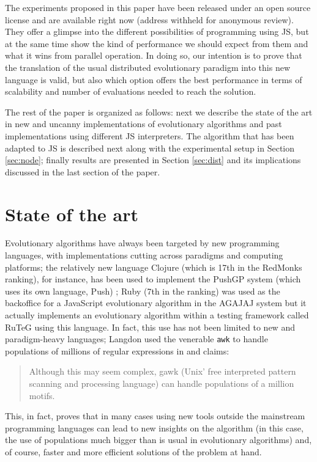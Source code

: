 \documentclass{sig-alternate}
\begin{document}
The experiments proposed in this paper have been released under an
open source license and are available right now (address withheld for
anonymous review). They offer a glimpse into the different
possibilities of programming using JS, but at the same time
show the kind of performance we should expect from them and what it
wins from parallel operation. In doing so, our intention is to prove
that the translation of the usual distributed evolutionary paradigm
into this new language is valid, but also which option offers the best
performance in terms of scalability and number of evaluations needed
to reach the solution.

The rest of the paper is organized as follows: next we describe the
state of the art in new and uncanny implementations of evolutionary algorithms and
past implementations using different JS interpreters. The
algorithm that has been adapted to JS is described next along with the
experimental setup in Section \ref{sec:node}; finally results are
presented in Section \ref{sec:dist} and its implications
discussed in the last section of the paper. 

\section{State of the art}
\label{sec:soa}

Evolutionary algorithms have always been targeted by new programming
languages, with implementations cutting across paradigms and computing
platforms; the relatively new language Clojure (which is 17th in the
RedMonks ranking), for instance, has been used to implement the PushGP
system (which uses its own language, Push) \cite{helmuth2013evolving};
Ruby (7th in the ranking) was used as the backoffice for a JavaScript
evolutionary algorithm in the AGAJAJ system \cite{agajaj} but it
actually implements an evolutionary algorithm within a testing
framework called RuTeG \cite{mairhofer2011search} using this
language. In fact, this use has not been limited to new and
paradigm-heavy languages; Langdon used the venerable {\tt awk} to
handle populations of millions of regular expressions in
\cite{langdon2008evolving,langdon2009evolving} and claims:
\begin{quote}
Although this may seem complex, gawk (Unix' free interpreted pattern
scanning and processing language) can handle populations of a million
motifs. 
\end{quote}
This, in fact, proves that in many cases using new tools outside the
mainstream programming languages can lead to new insights on the
algorithm (in this case, the use of populations much bigger than is
usual in evolutionary algorithms) and, of course, faster and more
efficient solutions of the problem at hand. 
\end{document}

